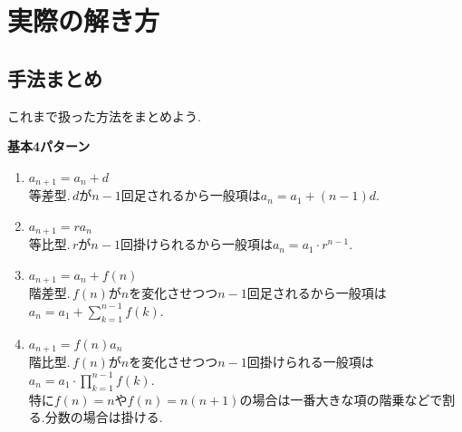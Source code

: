 \documentclass[dvipdfmx,a4paper,11pt,fleqn,openany]{jsbook}
\begin{document}
\chapter{実際の解き方}
  \section{手法まとめ}
  これまで扱った方法をまとめよう.

  \noindent \textbf{基本4パターン}
  \begin{enumerate}
    \item $a_{n+1}=a_n+d$\\
          等差型.\,$d$が$n-1$回足されるから一般項は$a_n=a_1+(n-1)d$.
    \item $a_{n+1}=ra_n$\\
          等比型.\,$r$が$n-1$回掛けられるから一般項は$a_n=a_1\cdot r^{n-1}$.
    \item $a_{n+1}=a_n+f(n)$\\
          階差型.\,$f(n)$が$n$を変化させつつ$n-1$回足されるから一般項は$\displaystyle a_n=a_1+\sum_{k=1}^{n-1} f(k)$.
    \item $a_{n+1}=f(n)a_n$\\
          階比型.\,$f(n)$が$n$を変化させつつ$n-1$回掛けられる一般項は$\displaystyle a_n=a_1\cdot\prod_{k=1}^{n-1} f(k)$.\\
          特に$f(n)=n$や$f(n)=n(n+1)$の場合は一番大きな項の階乗などで割る.分数の場合は掛ける.
  \end{enumerate}
\end{document}
